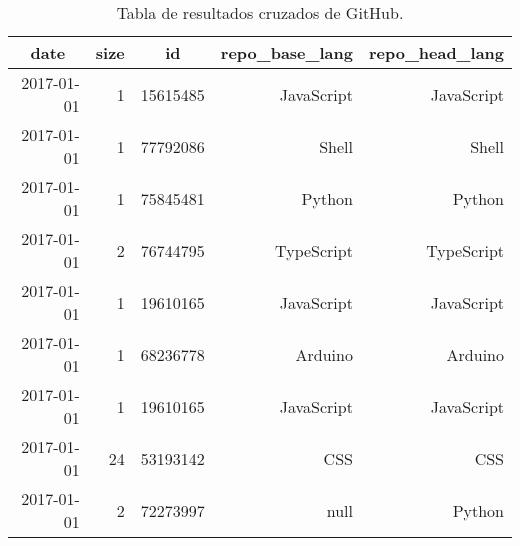 \begin{table}[htp!]
	\centering
	\caption{Tabla de resultados cruzados de GitHub.}
	\label{git:resultFinal}
	\begin{tabular}{|r|r|r|r|r|}
		\hline
		\multicolumn{1}{|c|}{\textbf{date}} & \multicolumn{1}{c|}{\textbf{size}} & \multicolumn{1}{c|}{\textbf{id}} & \multicolumn{1}{c|}{\textbf{repo\_base\_lang}} & \multicolumn{1}{c|}{\textbf{repo\_head\_lang}} \\ \hline
		2017-01-01                          & 1                                  & 15615485                         & JavaScript                                     & JavaScript                                     \\
		2017-01-01                          & 1                                  & 77792086                         & Shell                                          & Shell                                          \\
		2017-01-01                          & 1                                  & 75845481                         & Python                                         & Python                                         \\
		2017-01-01                          & 2                                  & 76744795                         & TypeScript                                     & TypeScript                                     \\
		2017-01-01                          & 1                                  & 19610165                         & JavaScript                                     & JavaScript                                     \\
		2017-01-01                          & 1                                  & 68236778                         & Arduino                                        & Arduino                                        \\
		2017-01-01                          & 1                                  & 19610165                         & JavaScript                                     & JavaScript                                     \\
		2017-01-01                          & 24                                 & 53193142                         & CSS                                            & CSS                                            \\
		2017-01-01                          & 2                                  & 72273997                         & null                                           & Python                                         \\

\end{tabular}
\end{table}
